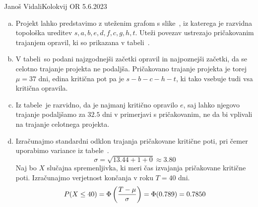 \begin{naloga}{Janoš Vidali}{Kolokvij OR 5.6.2023}
\begin{odgovor}
\begin{enumerate}[(a)]
\item Projekt lahko predstavimo z uteženim grafom s slike~\fig,
iz katerega je raz\-vid\-na topološka ureditev
$s, a, b, e, d, f, c, g, h, t$.
Uteži povezav ustrezajo pričakovanim trajanjem opravil,
ki so prikazana v tabeli~.

\item V tabeli~
so podani najzgodnejši začetki opravil in najpoznejši začetki,
da se celotno trajanje projekta ne podaljša.
Pričakovano trajanje projekta je torej $\mu = 37$ dni,
edina kritična pot pa je $s - b - c - h - t$,
ki tako vsebuje tudi vsa kritična opravila.

\item Iz tabele~ je razvidno,
da je najmanj kritično opravilo $e$,
saj lahko njegovo trajanje
podaljšamo za $32.5$ dni v primerjavi s pričakovanim,
ne da bi vplivali na trajanje celotnega projekta.

\item Izračunajmo standardni odklon trajanja pričakovane kritične poti,
pri čemer uporabimo variance iz tabele~.
$$
\sigma = \sqrt{13.44 + 1 + 0} \approx 3.80
$$
Naj bo $X$ slučajna spremenljivka,
ki meri čas izvajanja pričakovane kritične poti.
Izračunajmo verjetnost končanja v roku $T = 40$ dni.
$$
P(X \le 40) = \Phi\left({T - \mu \over \sigma}\right) = \Phi(0.789) = 0.7850
$$
\end{enumerate}
%
\begin{slika}
\makebox[\textwidth][c]{
\pgfslika
}
\end{slika}
%
\begin{tabela}
\end{tabela}
\end{odgovor}
\end{naloga}
